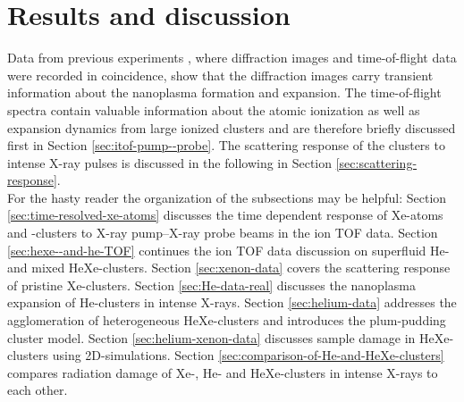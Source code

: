 \chapter{Results and discussion}\label{ch:results}
Data from previous experiments \cite{Bostedt-2012-PRL,Gorkhover-2016-NatPho,Ferguson-2016-SciAdv}, where diffraction images and time-of-flight data were recorded in coincidence, show that the diffraction images carry transient information about the nanoplasma formation and expansion. The time-of-flight spectra contain valuable information about the atomic ionization as well as expansion dynamics from large ionized clusters and are therefore briefly discussed first in Section \ref{sec:itof-pump--probe}. The scattering response of the clusters to intense X-ray pulses is discussed in the following in Section \ref{sec:scattering-response}.\\[1\baselineskip]
%
For the hasty reader the organization of the subsections may be helpful: Section \ref{sec:time-resolved-xe-atoms} discusses the time dependent response of Xe-atoms and -clusters to X-ray pump--X-ray probe beams in the ion TOF data. Section \ref{sec:hexe--and-he-TOF} continues the ion TOF data discussion on superfluid He- and mixed HeXe-clusters. Section \ref{sec:xenon-data} covers the scattering response of pristine Xe-clusters. Section \ref{sec:He-data-real} discusses the nanoplasma expansion of He-clusters in intense X-rays. Section \ref{sec:helium-data} addresses the agglomeration of heterogeneous HeXe-clusters and introduces the plum-pudding cluster model. Section \ref{sec:helium-xenon-data} discusses sample damage in HeXe-clusters using 2D-simulations. Section \ref{sec:comparison-of-He-and-HeXe-clusters} compares radiation damage of Xe-, He- and HeXe-clusters in intense X-rays to each other.\\[1\baselineskip]
